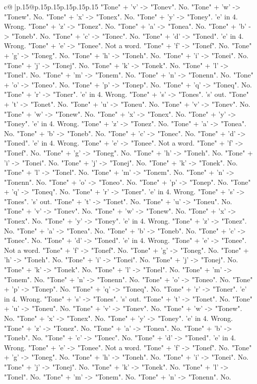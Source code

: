 \documentclass{article}
\begin{document}
{\begin{supertabular}{c@{$\;$}|p{.15\linewidth}@{}p{.15\linewidth}p{.15\linewidth}p{.15\linewidth}p{.15\linewidth}p{.15\linewidth}}
{{{"Tone" + 'v' {-}> "Tonev". No. "Tone" + 'w' {-}> "Tonew". No. "Tone" + 'x' {-}> "Tonex". No. "Tone" + 'y' {-}> "Toney". 'e' in 4. Wrong. "Tone" + 'z' {-}> "Tonez". No. "Tone" + 'a' {-}> "Tonea". No. "Tone" + 'b' {-}> "Toneb". No. "Tone" + 'c' {-}> "Tonec". No. "Tone" + 'd' {-}> "Toned". 'e' in 4. Wrong. "Tone" + 'e' {-}> "Tonee". Not a word. "Tone" + 'f' {-}> "Tonef". No. "Tone" + 'g' {-}> "Toneg". No. "Tone" + 'h' {-}> "Toneh". No. "Tone" + 'i' {-}> "Tonei". No. "Tone" + 'j' {-}> "Tonej". No. "Tone" + 'k' {-}> "Tonek". No. "Tone" + 'l' {-}> "Tonel". No. "Tone" + 'm' {-}> "Tonem". No. "Tone" + 'n' {-}> "Tonenn". No. "Tone" + 'o' {-}> "Toneo". No. "Tone" + 'p' {-}> "Tonep". No. "Tone" + 'q' {-}> "Toneq". No. "Tone" + 'r' {-}> "Toner". 'e' in 4. Wrong. "Tone" + 's' {-}> "Tones". 's' out. "Tone" + 't' {-}> "Tonet". No. "Tone" + 'u' {-}> "Toneu". No. "Tone" + 'v' {-}> "Tonev". No. "Tone" + 'w' {-}> "Tonew". No. "Tone" + 'x' {-}> "Tonex". No. "Tone" + 'y' {-}> "Toney". 'e' in 4. Wrong. "Tone" + 'z' {-}> "Tonez". No. "Tone" + 'a' {-}> "Tonea". No. "Tone" + 'b' {-}> "Toneb". No. "Tone" + 'c' {-}> "Tonec". No. "Tone" + 'd' {-}> "Toned". 'e' in 4. Wrong. "Tone" + 'e' {-}> "Tonee". Not a word. "Tone" + 'f' {-}> "Tonef". No. "Tone" + 'g' {-}> "Toneg". No. "Tone" + 'h' {-}> "Toneh". No. "Tone" + 'i' {-}> "Tonei". No. "Tone" + 'j' {-}> "Tonej". No. "Tone" + 'k' {-}> "Tonek". No. "Tone" + 'l' {-}> "Tonel". No. "Tone" + 'm' {-}> "Tonem". No. "Tone" + 'n' {-}> "Tonenn". No. "Tone" + 'o' {-}> "Toneo". No. "Tone" + 'p' {-}> "Tonep". No. "Tone" + 'q' {-}> "Toneq". No. "Tone" + 'r' {-}> "Toner". 'e' in 4. Wrong. "Tone" + 's' {-}> "Tones". 's' out. "Tone" + 't' {-}> "Tonet". No. "Tone" + 'u' {-}> "Toneu". No. "Tone" + 'v' {-}> "Tonev". No. "Tone" + 'w' {-}> "Tonew". No. "Tone" + 'x' {-}> "Tonex". No. "Tone" + 'y' {-}> "Toney". 'e' in 4. Wrong. "Tone" + 'z' {-}> "Tonez". No. "Tone" + 'a' {-}> "Tonea". No. "Tone" + 'b' {-}> "Toneb". No. "Tone" + 'c' {-}> "Tonec". No. "Tone" + 'd' {-}> "Toned". 'e' in 4. Wrong. "Tone" + 'e' {-}> "Tonee". Not a word. "Tone" + 'f' {-}> "Tonef". No. "Tone" + 'g' {-}> "Toneg". No. "Tone" + 'h' {-}> "Toneh". No. "Tone" + 'i' {-}> "Tonei". No. "Tone" + 'j' {-}> "Tonej". No. "Tone" + 'k' {-}> "Tonek". No. "Tone" + 'l' {-}> "Tonel". No. "Tone" + 'm' {-}> "Tonem". No. "Tone" + 'n' {-}> "Tonenn". No. "Tone" + 'o' {-}> "Toneo". No. "Tone" + 'p' {-}> "Tonep". No. "Tone" + 'q' {-}> "Toneq". No. "Tone" + 'r' {-}> "Toner". 'e' in 4. Wrong. "Tone" + 's' {-}> "Tones". 's' out. "Tone" + 't' {-}> "Tonet". No. "Tone" + 'u' {-}> "Toneu". No. "Tone" + 'v' {-}> "Tonev". No. "Tone" + 'w' {-}> "Tonew". No. "Tone" + 'x' {-}> "Tonex". No. "Tone" + 'y' {-}> "Toney". 'e' in 4. Wrong. "Tone" + 'z' {-}> "Tonez". No. "Tone" + 'a' {-}> "Tonea". No. "Tone" + 'b' {-}> "Toneb". No. "Tone" + 'c' {-}> "Tonec". No. "Tone" + 'd' {-}> "Toned". 'e' in 4. Wrong. "Tone" + 'e' {-}> "Tonee". Not a word. "Tone" + 'f' {-}> "Tonef". No. "Tone" + 'g' {-}> "Toneg". No. "Tone" + 'h' {-}> "Toneh". No. "Tone" + 'i' {-}> "Tonei". No. "Tone" + 'j' {-}> "Tonej". No. "Tone" + 'k' {-}> "Tonek". No. "Tone" + 'l' {-}> "Tonel". No. "Tone" + 'm' {-}> "Tonem". No. "Tone" + 'n' {-}> "Tonenn". No. }}}
\end{supertabular}}
\end{document}

